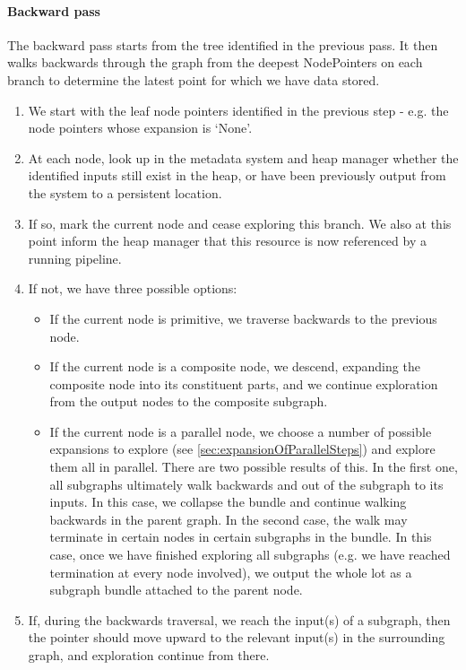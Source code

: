 \documentclass[10pt,a4paper]{article}
\begin{document}
\begin{appendices}
\paragraph{Backward pass}
The backward pass starts from the tree identified in the previous pass. It then walks backwards through the graph from the deepest NodePointers on each branch to determine the latest point for which we have data stored.
\begin{enumerate}
\item We start with the leaf node pointers identified in the previous step - e.g. the node pointers whose expansion is `None'. 
\item At each node, look up in the metadata system and heap manager whether the identified inputs still exist in the heap, or have been previously output from the system to a persistent location.
\item If so, mark the current node and cease exploring this branch. We also at this point inform the heap manager that this resource is now referenced by a running pipeline.
\item If not, we have three possible options:
\begin{itemize}
\item If the current node is primitive, we traverse backwards to the previous node.
\item If the current node is a composite node, we descend, expanding the composite node into its constituent parts, and we continue exploration from the output nodes to the composite subgraph.
\item If the current node is a parallel node, we choose a number of possible expansions to explore (see \ref{sec:expansionOfParallelSteps}) and explore them all in parallel. There are two possible results of this. In the first one, all subgraphs ultimately walk backwards and out of the subgraph to its inputs. In this case, we collapse the bundle and continue walking backwards in the parent graph. In the second case, the walk may terminate in certain nodes in certain subgraphs in the bundle. In this case, once we have finished exploring all subgraphs (e.g. we have reached termination at every node involved), we output the whole lot as a subgraph bundle attached to the parent node.
\end{itemize}
\item If, during the backwards traversal, we reach the input(s) of a subgraph, then the pointer should move upward to the relevant input(s) in the surrounding graph, and exploration continue from there.

\end{enumerate}
\end{appendices}
\end{document}
